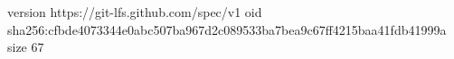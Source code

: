 version https://git-lfs.github.com/spec/v1
oid sha256:cfbde4073344e0abc507ba967d2c089533ba7bea9c67ff4215baa41fdb41999a
size 67

